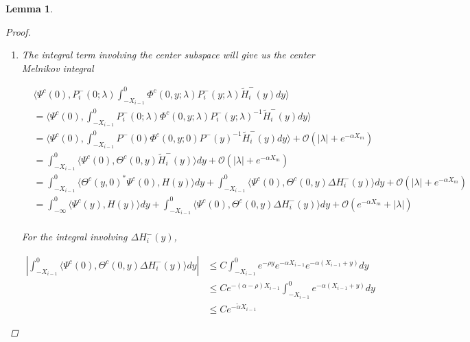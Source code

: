 \documentclass[12pt]{article}
\newtheorem{lemma}{Lemma}
\begin{document}
\begin{lemma}
\begin{proof}
\begin{enumerate}
Combining all of these, the terms involving $c_i$ are given by

\begin{align*}
e^{\nu(\lambda) X_{i-1} } &c_{i-1}^- - e^{-\nu(\lambda)X_i} c_i^- + \mathcal{O}\Big( (|\lambda| + e^{-\alpha X_m})(|\tilde{c}_{i-1}^+| + |\tilde{c}_i^-|) + e^{-(\alpha - \rho) X_i}  (|\lambda| + e^{-\tilde{\alpha}X_m})|\tilde{c}_{i+1}^-| \\
&+ e^{-\tilde{\alpha}X_m}(|\lambda| + |D_i|)|d| \Big)  
\end{align*}

\item The integral term involving the center subspace will give us the center Melnikov integral

\begin{align*}
&\langle \Psi^c(0), P_i^-(0; \lambda) \int_{-X_{i-1}}^0 \Phi^c(0, y; \lambda) P_i^-(y; \lambda) \tilde{H}_i^-(y) dy \rangle \\
&= \langle \Psi^c(0), \int_{-X_{i-1}}^0 P_i^-(0; \lambda) \Phi^c(0, y; \lambda) P_i^-(y; \lambda)^{-1} \tilde{H}_i^-(y) dy \rangle \\
&= \langle \Psi^c(0), \int_{-X_{i-1}}^0 P^-(0) \Phi^c(0, y; 0) P^-(y)^{-1} \tilde{H}_i^-(y) dy \rangle + \mathcal{O}(|\lambda| + e^{-\alpha X_m}) \\
&= \int_{-X_{i-1}}^0 \langle \Psi^c(0), \Theta^c(0, y) \tilde{H}_i^-(y) \rangle dy + \mathcal{O}(|\lambda| + e^{-\alpha X_m}) \\
&= \int_{-X_{i-1}}^0 \langle \Theta^c(y, 0)^* \Psi^c(0), H(y) \rangle dy + \int_{-X_{i-1}}^0 \langle \Psi^c(0), \Theta^c(0, y) \Delta H_i^-(y) \rangle dy + \mathcal{O}(|\lambda| + e^{-\alpha X_m}) \\
&= \int_{-\infty}^0 \langle \Psi^c(y), H(y) \rangle dy + \int_{-X_{i-1}}^0 \langle \Psi^c(0), \Theta^c(0, y) \Delta H_i^-(y) \rangle dy + \mathcal{O}(e^{-\alpha X_m} + |\lambda|) \\
\end{align*}

For the integral involving $\Delta H_i^-(y)$,

\begin{align*}
\left| \int_{-X_{i-1}}^0 \langle \Psi^c(0), \Theta^c(0, y) \Delta H_i^-(y) \rangle dy \right| &\leq C \int_{-X_{i-1}}^0 e^{-\rho y} e^{-\alpha X_{i-1}} e^{-\alpha(X_{i-1} + y)} dy \\
&\leq C e^{-(\alpha - \rho)X_{i-1}} \int_{-X_{i-1}}^0 e^{-\alpha(X_{i-1} + y)} dy \\
&\leq C e^{-\tilde{\alpha}X_{i-1}}
\end{align*}


\end{enumerate}
\end{proof}
\end{lemma}
\end{document}
